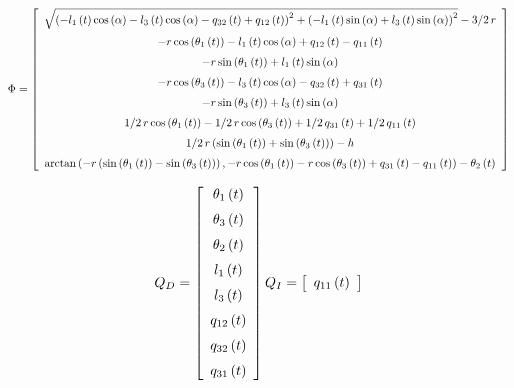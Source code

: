 \begin{equation*}
 \Phi =   \left[ \begin {array}{c} \sqrt { \left( -l_{1} \left( t \right) \cos
 \left( \alpha \right) -l_{3} \left( t \right) \cos \left( \alpha
 \right) -q_{32} \left( t \right) +q_{12} \left( t \right)  \right) ^{
2}+ \left( -l_{1} \left( t \right) \sin \left( \alpha \right) +l_{3}
 \left( t \right) \sin \left( \alpha \right)  \right) ^{2}}-3/2\,r
\\ \noalign{\medskip}-r\cos \left( \theta_{1} \left( t \right) 
 \right) -l_{1} \left( t \right) \cos \left( \alpha \right) +q_{12}
 \left( t \right) -q_{11} \left( t \right) \\ \noalign{\medskip}-r\sin
 \left( \theta_{1} \left( t \right)  \right) +l_{1} \left( t \right) 
\sin \left( \alpha \right) \\ \noalign{\medskip}-r\cos \left( \theta_{
3} \left( t \right)  \right) -l_{3} \left( t \right) \cos \left( 
\alpha \right) -q_{32} \left( t \right) +q_{31} \left( t \right) 
\\ \noalign{\medskip}-r\sin \left( \theta_{3} \left( t \right) 
 \right) +l_{3} \left( t \right) \sin \left( \alpha \right) 
\\ \noalign{\medskip}1/2\,r\cos \left( \theta_{1} \left( t \right) 
 \right) -1/2\,r\cos \left( \theta_{3} \left( t \right)  \right) +1/2
\,q_{31} \left( t \right) +1/2\,q_{11} \left( t \right) 
\\ \noalign{\medskip}1/2\,r \left( \sin \left( \theta_{1} \left( t
 \right)  \right) +\sin \left( \theta_{3} \left( t \right)  \right) 
 \right) -h\\ \noalign{\medskip}\arctan \left( -r \left( \sin \left( 
\theta_{1} \left( t \right)  \right) -\sin \left( \theta_{3} \left( t
 \right)  \right)  \right) ,-r\cos \left( \theta_{1} \left( t \right) 
 \right) -r\cos \left( \theta_{3} \left( t \right)  \right) +q_{31}
 \left( t \right) -q_{11} \left( t \right)  \right) -\theta_{2}
 \left( t \right) \end {array} \right]
\end{equation*}

\begin{align*}
   Q_D =  \left[ \begin {array}{c} \theta_{1} \left( t \right) 
\\ \noalign{\medskip}\theta_{3} \left( t \right) \\ \noalign{\medskip}
\theta_{2} \left( t \right) \\ \noalign{\medskip}l_{1} \left( t
 \right) \\ \noalign{\medskip}l_{3} \left( t \right) 
\\ \noalign{\medskip}q_{12} \left( t \right) \\ \noalign{\medskip}q_{
32} \left( t \right) \\ \noalign{\medskip}q_{31} \left( t \right) 
\end {array} \right] 
Q_I =    \left[ \begin {array}{c} q_{11} \left( t \right) \end {array}
 \right]
\end{align*}


